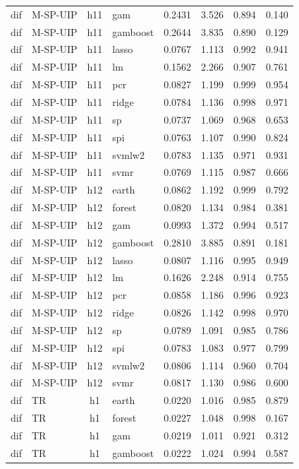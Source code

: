 \begin{ThreePartTable}
\begin{longtable}[t]{llclcccc}
dif & M-SP-UIP & h11 & gam & 0.2431 & 3.526 & 0.894 & 0.140\\
dif & M-SP-UIP & h11 & gamboost & 0.2644 & 3.835 & 0.890 & 0.129\\
dif & M-SP-UIP & h11 & lasso & 0.0767 & 1.113 & 0.992 & 0.941\\
dif & M-SP-UIP & h11 & lm & 0.1562 & 2.266 & 0.907 & 0.761\\
dif & M-SP-UIP & h11 & pcr & 0.0827 & 1.199 & 0.999 & 0.954\\
dif & M-SP-UIP & h11 & ridge & 0.0784 & 1.136 & 0.998 & 0.971\\
dif & M-SP-UIP & h11 & sp & 0.0737 & 1.069 & 0.968 & 0.653\\
dif & M-SP-UIP & h11 & spi & 0.0763 & 1.107 & 0.990 & 0.824\\
dif & M-SP-UIP & h11 & svmlw2 & 0.0783 & 1.135 & 0.971 & 0.931\\
dif & M-SP-UIP & h11 & svmr & 0.0769 & 1.115 & 0.987 & 0.666\\
\addlinespace
dif & M-SP-UIP & h12 & earth & 0.0862 & 1.192 & 0.999 & 0.792\\
dif & M-SP-UIP & h12 & forest & 0.0820 & 1.134 & 0.984 & 0.381\\
dif & M-SP-UIP & h12 & gam & 0.0993 & 1.372 & 0.994 & 0.517\\
dif & M-SP-UIP & h12 & gamboost & 0.2810 & 3.885 & 0.891 & 0.181\\
dif & M-SP-UIP & h12 & lasso & 0.0807 & 1.116 & 0.995 & 0.949\\
dif & M-SP-UIP & h12 & lm & 0.1626 & 2.248 & 0.914 & 0.755\\
dif & M-SP-UIP & h12 & pcr & 0.0858 & 1.186 & 0.996 & 0.923\\
dif & M-SP-UIP & h12 & ridge & 0.0826 & 1.142 & 0.998 & 0.970\\
dif & M-SP-UIP & h12 & sp & 0.0789 & 1.091 & 0.985 & 0.786\\
dif & M-SP-UIP & h12 & spi & 0.0783 & 1.083 & 0.977 & 0.799\\
dif & M-SP-UIP & h12 & svmlw2 & 0.0806 & 1.114 & 0.960 & 0.704\\
dif & M-SP-UIP & h12 & svmr & 0.0817 & 1.130 & 0.986 & 0.600\\
\addlinespace
dif & TR & h1 & earth & 0.0220 & 1.016 & 0.985 & 0.879\\
dif & TR & h1 & forest & 0.0227 & 1.048 & 0.998 & 0.167\\
dif & TR & h1 & gam & 0.0219 & 1.011 & 0.921 & 0.312\\
dif & TR & h1 & gamboost & 0.0222 & 1.024 & 0.994 & 0.587\\

\end{longtable}
\end{ThreePartTable}
